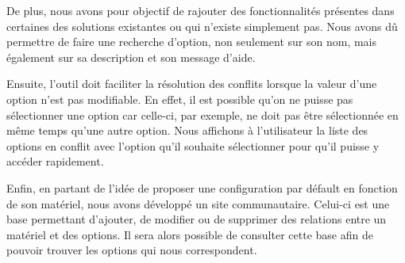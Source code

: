 \documentclass[16pts]{report}
\begin{document}
De plus, nous avons pour objectif de rajouter des fonctionnalités présentes 
dans certaines des solutions existantes ou qui n'existe simplement pas. 
Nous avons dû permettre de faire une recherche d'option, non seulement 
sur son nom, mais également sur sa description et son message d'aide.

Ensuite, l'outil doit faciliter la résolution des conflits lorsque la 
valeur d'une option n'est pas modifiable. En effet, il est possible qu'on 
ne puisse pas sélectionner une option car celle-ci, par exemple, ne doit 
pas être sélectionnée en même temps qu'une autre option. Nous affichons 
à l'utilisateur la liste des options en conflit avec l'option qu'il 
souhaite sélectionner pour qu'il puisse y accéder rapidement.

Enfin, en partant de l'idée de proposer une configuration par défault en 
fonction de son matériel, nous avons développé un site communautaire. 
Celui-ci est une base permettant d'ajouter, de modifier ou de supprimer 
des relations entre un matériel et des options. Il sera alors possible de 
consulter cette base afin de pouvoir trouver les options qui nous 
correspondent.
\end{document}
